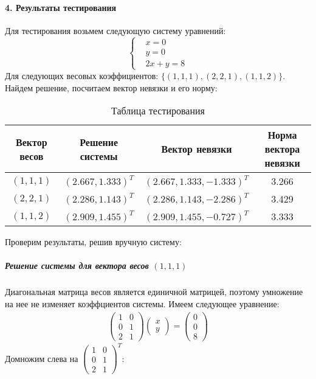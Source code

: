 \documentclass[11pt,a4paper]{report}
\begin{document}
\paragraph{4. Результаты тестирования}
Для тестирования возьмем следующую систему уравнений:
\[
\left\{\begin{aligned}
&x = 0\\
&y = 0\\
&2x + y = 8
\end{aligned}\right.
\]
Для следующих весовых коэффициентов: $\{(1,1,1), (2,2,1), (1,1,2)\}$.
\newline
Найдем решение, посчитаем вектор невязки и его норму:
\begin{table}[htbp]
	\begin{center}
		\caption{Таблица тестирования}
		\begin{tabular}{|c|c|c|c|}
			\hline
			Вектор весов & Решение системы & Вектор невязки  & Норма вектора невязки \\
			\hline
			$(1,1,1)$ & $(2.667, 1.333)^T$ & $(2.667, 1.333,-1.333)^T$& 3.266\\
			\hline
			$(2,2,1)$ & $(2.286, 1.143)^T$ & $(2.286, 1.143,-2.286)^T$& 3.429\\
			\hline
			$(1,1,2)$ & $(2.909, 1.455)^T$ & $(2.909, 1.455,-0.727)^T$& 3.333 \\
			\hline
		\end{tabular}	
	\end{center}
\end{table}
Проверим результаты, решив вручную систему:
\newline
\subparagraph{Решение системы для вектора весов $(1,1,1)$}
Диагональная матрица весов является единичной матрицей, поэтому умножение на нее не изменяет коэффциентов системы. Имеем следующее уравнение:
\begin{gather*}
	\begin{pmatrix} 1&0\\0&1\\2&1 \end{pmatrix}\begin{pmatrix} x\\y \end{pmatrix}=\begin{pmatrix} 0\\0\\8 \end{pmatrix}
\end{gather*}
Домножим слева на $\begin{pmatrix} 1&0\\0&1\\2&1 \end{pmatrix}^T$:
\end{document}
